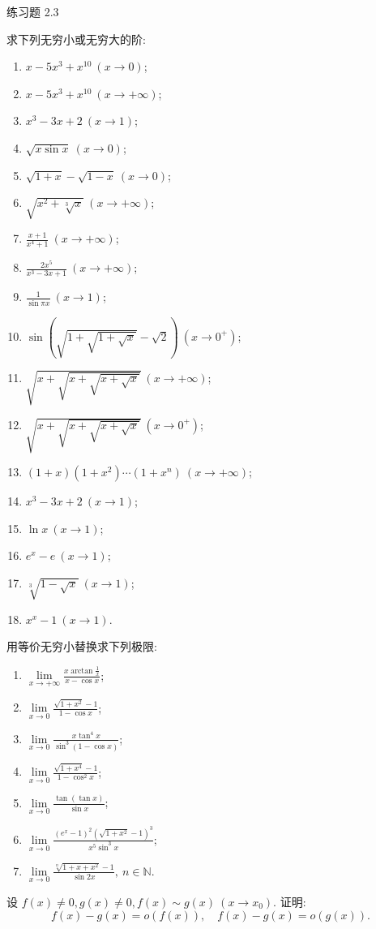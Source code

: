 \begin{exblock}{练习题 2.3}
\item 求下列无穷小或无穷大的阶:
  \begin{enumerate}[label=(\arabic*)]
    \item $x - 5x^3 + x^{10}\ (x \to 0)$;
    \item $x - 5x^3 + x^{10}\ (x \to +\infty)$;
    \item $x^3 - 3x + 2\ (x \to 1)$;
    \item $\sqrt{x\sin x}\ (x \to 0)$;
    \item $\sqrt{1+x} - \sqrt{1-x}\ (x \to 0)$;
    \item $\sqrt{x^2 + \sqrt[3]{x}}\ (x \to +\infty)$;
    \item $\frac{x+1}{x^4+1}\ (x \to +\infty)$;
    \item $\frac{2x^5}{x^3 - 3x + 1}\ (x \to +\infty)$;
    \item $\frac{1}{\sin\pi x}\ (x \to 1)$;
    \item $\sin\left(\sqrt{1+\sqrt{1+\sqrt{x}}} - \sqrt{2}\right)\ (x \to 0^+)$;
    \item $\sqrt{x + \sqrt{x + \sqrt{x + \sqrt{x}}}}\ (x \to +\infty)$;
    \item $\sqrt{x + \sqrt{x + \sqrt{x + \sqrt{x}}}}\ (x \to 0^+)$;
    \item $(1+x)(1+x^2)\cdots(1+x^n)\ (x \to +\infty)$;
    \item $x^3 - 3x + 2\ (x \to 1)$;
    \item $\ln x\ (x \to 1)$;
    \item $e^x - e\ (x \to 1)$;
    \item $\sqrt[3]{1 - \sqrt{x}}\ (x \to 1)$;
    \item $x^x - 1\ (x \to 1)$.
  \end{enumerate}

\item 用等价无穷小替换求下列极限:
  \begin{enumerate}[label=(\arabic*)]
    \item $\lim\limits_{x\to+\infty}\frac{x\arctan\frac{1}{x}}{x-\cos x}$;
    \item $\lim\limits_{x\to0}\frac{\sqrt{1+x^2}-1}{1-\cos x}$;
    \item $\lim\limits_{x\to0}\frac{x\tan^4 x}{\sin^3(1-\cos x)}$;
    \item $\lim\limits_{x\to0}\frac{\sqrt{1+x^4}-1}{1-\cos^2 x}$;
    \item $\lim\limits_{x\to0}\frac{\tan(\tan x)}{\sin x}$;
    \item $\lim\limits_{x\to0}\frac{(e^x-1)^2(\sqrt{1+x^2}-1)^3}{x^5\sin^3 x}$;
    \item $\lim\limits_{x\to0}\frac{\sqrt[n]{1+x+x^2}-1}{\sin 2x},\ n \in \mathbb{N}$.
  \end{enumerate}

\item 设 $f(x) \neq 0, g(x) \neq 0, f(x) \sim g(x)\ (x \to x_0)$. 证明:
  \[
  f(x) - g(x) = o(f(x)),\quad f(x) - g(x) = o(g(x)).
\]
\end{exblock}

